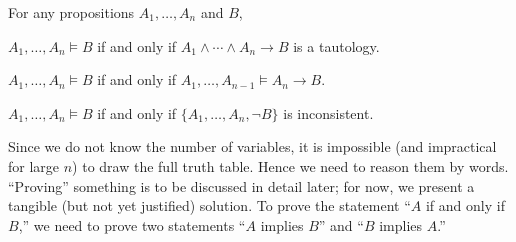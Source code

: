 \begin{lemma}
    \label{lem:consq}
    For any propositions \(A_1,\dots,A_n\) and \(B\),
    \begin{nlist}
        \item \(A_1,\dots,A_n\models B\)
        if and only if
        \(A_1\wedge\cdots\wedge A_n\to B\) is a tautology.
        \item \(A_1,\dots,A_n\models B\)
        if and only if
        \(A_1,\dots,A_{n-1}\models A_n\to B\).
        \item \(A_1,\dots,A_n\models B\)
        if and only if
        \(\{A_1,\dots,A_n,\neg B\}\) is inconsistent.
    \end{nlist}
\end{lemma}
\begin{sketch}
    Since we do not know the number of variables,
    it is impossible (and impractical for large \(n\))
    to draw the full truth table.
    Hence we need to reason them by words.
    ``Proving'' something is to be discussed in detail later;
    for now, we present a tangible (but not yet justified) solution.
    To prove the statement ``\(A\) if and only if \(B\),''
    we need to prove two statements
    ``\(A\) implies \(B\)''
    and ``\(B\) implies \(A\).''
\end{sketch}
